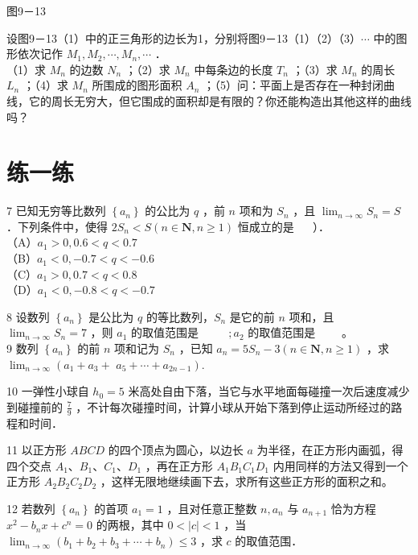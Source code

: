 \documentclass[10pt]{article}
\begin{document}
图9－13

设图9－13（1）中的正三角形的边长为1，分别将图9－13（1）（2）（3）\(\cdots\) 中的图形依次记作 \(M_{1}, M_{2}, \cdots, M_{n}, \cdots\) ．\\
（1）求 \(M_{n}\) 的边数 \(N_{n}\) ；（2）求 \(M_{n}\) 中每条边的长度 \(T_{n}\) ；（3）求 \(M_{n}\) 的周长 \(L_{n}\) ；（4）求 \(M_{n}\) 所围成的图形面积 \(A_{n}\) ；（5）问：平面上是否存在一种封闭曲线，它的周长无穷大，但它围成的面积却是有限的？你还能构造出其他这样的曲线吗？

\section*{练一练}
7 已知无穷等比数列 \(\left\{a_{n}\right\}\) 的公比为 \(q\) ，前 \(n\) 项和为 \(S_{n}\) ，且 \(\lim _{n \rightarrow \infty} S_{n}=S\) ．下列条件中，使得 \(2 S_{n}<S(n \in \mathbf{N}, n \geqslant 1)\) 恒成立的是 \(\quad\) ）．\\
（A）\(a_{1}>0,0.6<q<0.7\)\\
（B）\(a_{1}<0,-0.7<q<-0.6\)\\
（C）\(a_{1}>0,0.7<q<0.8\)\\
（D）\(a_{1}<0,-0.8<q<-0.7\)

8 设数列 \(\left\{a_{n}\right\}\) 是公比为 \(q\) 的等比数列，\(S_{n}\) 是它的前 \(n\) 项和，且 \(\lim _{n \rightarrow \infty} S_{n}=7\) ，则 \(a_{1}\) 的取值范围是 \(\qquad\) \(; a_{2}\) 的取值范围是 \(\qquad\)。\\
9 数列 \(\left\{a_{n}\right\}\) 的前 \(n\) 项和记为 \(S_{n}\) ，已知 \(a_{n}=5 S_{n}-3(n \in \mathbf{N}, n \geqslant 1)\) ，求 \(\lim _{n \rightarrow \infty}\left(a_{1}+a_{3}+\right.\) \(\left.a_{5}+\cdots+a_{2 n-1}\right)\).

10 一弹性小球自 \(h_{0}=5\) 米高处自由下落，当它与水平地面每碰撞一次后速度减少到碰撞前的 \(\frac{7}{9}\) ，不计每次碰撞时间，计算小球从开始下落到停止运动所经过的路程和时间．

11 以正方形 \(A B C D\) 的四个顶点为圆心，以边长 \(a\) 为半径，在正方形内画弧，得四个交点 \(A_{1} 、 B_{1} 、 C_{1} 、 D_{1}\) ，再在正方形 \(A_{1} B_{1} C_{1} D_{1}\) 内用同样的方法又得到一个正方形 \(A_{2} B_{2} C_{2} D_{2}\) ，这样无限地继续画下去，求所有这些正方形的面积之和。

12 若数列 \(\left\{a_{n}\right\}\) 的首项 \(a_{1}=1\) ，且对任意正整数 \(n, a_{n}\) 与 \(a_{n+1}\) 恰为方程 \(x^{2}-b_{n} x+c^{n}=0\) 的两根，其中 \(0<|c|<1\) ，当 \(\lim _{n \rightarrow \infty}\left(b_{1}+b_{2}+b_{3}+\cdots+b_{n}\right) \leqslant 3\) ，求 \(c\) 的取值范围．
\end{document}
